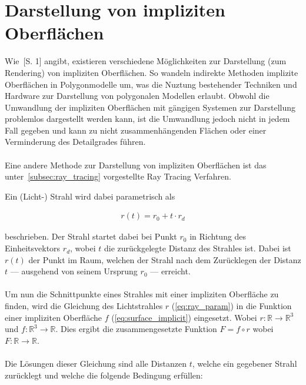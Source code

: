 
\section{Darstellung von impliziten Oberflächen}
\label{sec:description_implicit_surfaces}

Wie~\cite{hart_sphere_1994}[S. 1] angibt, existieren verschiedene Möglichkeiten
zur Darstellung (zum Rendering) von impliziten Oberflächen. So wandeln
indirekte Methoden implizite Oberflächen in Polygonmodelle um, was die Nuztung
bestehender Techniken und Hardware zur Darstellung von polygonalen Modellen
erlaubt. Obwohl die Umwandlung der impliziten Oberflächen mit gängigen Systemen
zur Darstellung problemlos dargestellt werden kann, ist die Umwandlung jedoch nicht
in jedem Fall gegeben und kann zu nicht zusammenhängenden Flächen oder einer
Verminderung des Detailgrades führen.\\
\\
Eine andere Methode zur Darstellung von impliziten Oberflächen ist das
unter~\ref{subsec:ray_tracing} vorgestellte Ray Tracing Verfahren.

Ein (Licht-) Strahl wird dabei parametrisch als

\begin{gather}\label{eq:ray_param}
    r(t) = r_{0} + t \cdot r_{d}
\end{gather}

beschrieben. Der Strahl startet dabei bei Punkt $r_{0}$ in Richtung des
Einheitsvektors $r_{d}$, wobei $t$ die zurückgelegte Distanz des Strahles ist.
Dabei ist $r(t)$ der Punkt im Raum, welchen der Strahl nach dem Zurücklegen der
Distanz $t$ --- ausgehend von seinem Ursprung $r_{0}$ --- erreicht.\\
\\
Um nun die Schnittpunkte eines Strahles mit einer impliziten Oberfläche zu finden, wird die Gleichung des Lichtstrahles $r$ (\ref{eq:ray_param}) in die Funktion einer impliziten Oberfläche $f$ (\ref{eq:surface_implicit}) eingesetzt. Wobei $r : \mathbb{R} \to \mathbb{R}^{3}$ und $f : \mathbb{R}^{3} \to \mathbb{R}$. Dies ergibt die zusammengesetzte Funktion $F = f \circ r$ wobei $F : \mathbb{R} \to \mathbb{R}$.\\
\\
Die Lösungen dieser Gleichung sind alle Distanzen $t$, welche ein gegebener Strahl zurücklegt und welche die folgende Bedingung erfüllen:

